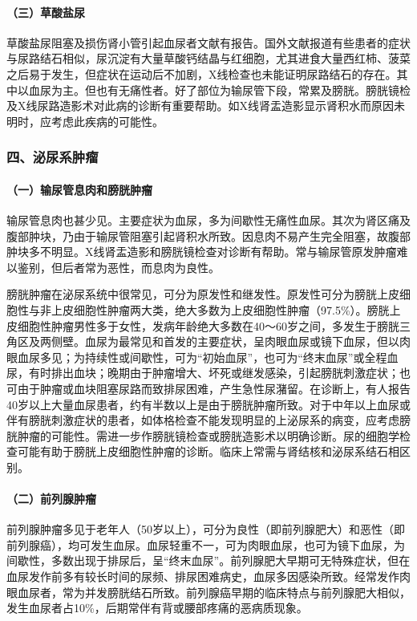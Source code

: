 \paragraph{（三）草酸盐尿}

草酸盐尿阻塞及损伤肾小管引起血尿者文献有报告。国外文献报道有些患者的症状与尿路结石相似，尿沉淀有大量草酸钙结晶与红细胞，尤其进食大量西红柿、菠菜之后易于发生，但症状在运动后不加剧，X线检查也未能证明尿路结石的存在。其中以血尿为主。但也有无痛性者。好了部位为输尿管下段，常累及膀胱。膀胱镜检及X线尿路造影术对此病的诊断有重要帮助。如X线肾盂造影显示肾积水而原因未明时，应考虑此疾病的可能性。

\subsubsection{四、泌尿系肿瘤}

\paragraph{（一）输尿管息肉和膀胱肿瘤}

输尿管息肉也甚少见。主要症状为血尿，多为间歇性无痛性血尿。其次为肾区痛及腹部肿块，乃由于输尿管阻塞引起肾积水所致。因息肉不易产生完全阻塞，故腹部肿块多不明显。X线肾盂造影和膀胱镜检查对诊断有帮助。常与输尿管原发肿瘤难以鉴别，但后者常为恶性，而息肉为良性。

膀胱肿瘤在泌尿系统中很常见，可分为原发性和继发性。原发性可分为膀胱上皮细胞性与非上皮细胞性肿瘤两大类，绝大多数为上皮细胞性肿瘤（97.5\%）。膀胱上皮细胞性肿瘤男性多于女性，发病年龄绝大多数在40～60岁之间，多发生于膀胱三角区及两侧壁。血尿为最常见和首发的主要症状，呈肉眼血尿或镜下血尿，但以肉眼血尿多见；为持续性或间歇性，可为“初始血尿”，也可为“终末血尿”或全程血尿，有时排出血块；晚期由于肿瘤增大、坏死或继发感染，引起膀胱刺激症状；也可由于肿瘤或血块阻塞尿路而致排尿困难，产生急性尿潴留。在诊断上，有人报告40岁以上大量血尿患者，约有半数以上是由于膀胱肿瘤所致。对于中年以上血尿或伴有膀胱刺激症状的患者，如体格检查不能发现明显的上泌尿系的病变，应考虑膀胱肿瘤的可能性。需进一步作膀胱镜检查或膀胱造影术以明确诊断。尿的细胞学检查可能有助于膀胱上皮细胞性肿瘤的诊断。临床上常需与肾结核和泌尿系结石相区别。

\paragraph{（二）前列腺肿瘤}

前列腺肿瘤多见于老年人（50岁以上），可分为良性（即前列腺肥大）和恶性（即前列腺癌），均可发生血尿。血尿轻重不一，可为肉眼血尿，也可为镜下血尿，为间歇性，多数出现于排尿后，呈“终末血尿”。前列腺肥大早期可无特殊症状，但在血尿发作前多有较长时间的尿频、排尿困难病史，血尿多因感染所致。经常发作肉眼血尿者，常为并发膀胱结石所致。前列腺癌早期的临床特点与前列腺肥大相似，发生血尿者占10\%，后期常伴有背或腰部疼痛的恶病质现象。

